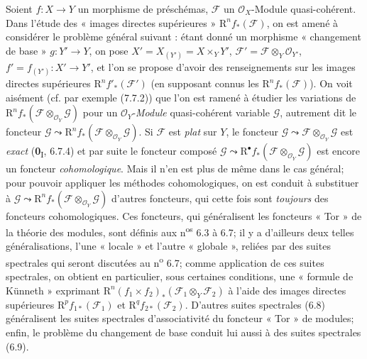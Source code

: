\begin{env}[6.1.1]
Soient $f:X\to Y$ un morphisme de préschémas, $\mathscr F$ un
$\mathscr O_X$-Module quasi-cohérent. Dans l'étude des « images directes
supérieures » $\mathrm R^n f_*(\mathscr F)$, on est amené à considérer le
problème général suivant : étant donné un morphisme « changement de base »
$g:Y'\to Y$, on pose
$X'=X_{(Y')}=X\times_Y Y'$, $\mathscr F'=\mathscr F\otimes_Y\mathscr O_{Y'}$, $f'=f_{(Y')}:X'\to Y'$,
et l'on se propose d'avoir des renseignements sur les images directes
supérieures $\mathrm R^n f'_*(\mathscr F')$ (en supposant connus les
$\mathrm R^n f_*(\mathscr F)$). On voit aisément (cf. par exemple (7.7.2))
que l'on est ramené à étudier les variations de
$\mathrm R^n f_*(\mathscr F\otimes_{\mathscr O_Y}\mathscr G)$ pour un
$\mathscr O_Y$-\emph{Module} quasi-cohérent variable $\mathscr G$, autrement dit le
foncteur
$\mathscr G\leadsto\mathrm R^n f_*(\mathscr F\otimes_{\mathscr O_Y}\mathscr G)$.
Si $\mathscr F$ est \emph{plat} sur $Y$, le foncteur
$\mathscr G\leadsto\mathscr F\otimes_{\mathscr O_Y}\mathscr G$ est \emph{exact}
(\textbf{0}\textsubscript{I}, 6.7.4) et par suite le foncteur composé
$\mathscr G\leadsto\mathrm R^\bullet f_*(\mathscr F\otimes_{\mathscr O_Y}\mathscr G)$
est encore un foncteur \emph{cohomologique}. Mais il n'en est plus de même dans le
cas général; pour pouvoir appliquer les méthodes cohomologiques, on est
conduit à substituer à
$\mathscr G\leadsto\mathrm R^n f_*(\mathscr F\otimes_{\mathscr O_Y}\mathscr G)$
d'autres foncteurs, qui cette fois sont \emph{toujours} des foncteurs
cohomologiques. Ces foncteurs, qui généralisent les foncteurs « Tor » de la
théorie des modules, sont définis aux n\textsuperscript{os} 6.3 à 6.7; il y a
d'ailleurs deux telles généralisations, l'une « locale » et l'autre
« globale », reliées par des suites spectrales qui seront discutées au
n\textsuperscript{o} 6.7; comme application de ces suites spectrales, on
obtient en particulier, sous certaines conditions, une « formule de Künneth »
exprimant
$\mathrm R^n(f_1\times f_2)_*(\mathscr F_1\otimes_Y\mathscr F_2)$
à l'aide des images directes supérieures
$\mathrm R^p f_{1*}(\mathscr F_1)$ et $\mathrm R^q f_{2*}(\mathscr F_2)$.
D'autres suites spectrales (6.8) généralisent les suites spectrales
d'associativité du foncteur « Tor » de modules; enfin, le problème du
changement de base conduit lui aussi à des suites spectrales (6.9).
\end{env}

